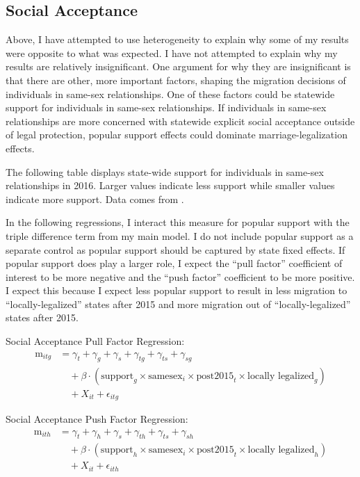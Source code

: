 \documentclass[12pt,letterpaper]{article}
\begin{document}
\clearpage
\subsection{Social Acceptance}

Above, I have attempted to use heterogeneity to explain why some of my results were opposite to what was expected. I have not attempted to explain why my results are relatively insignificant. One argument for why they are insignificant is that there are other, more important factors, shaping the migration decisions of individuals in same-sex relationships. One of these factors could be statewide support for individuals in same-sex relationships. If individuals in same-sex relationships are more concerned with statewide explicit social acceptance outside of legal protection, popular support effects could dominate marriage-legalization effects.

The following table displays state-wide support for individuals in same-sex relationships in 2016. Larger values indicate less support while smaller values indicate more support. Data comes from \citet{29}.



In the following regressions, I interact this measure for popular support with the triple difference term from my main model. I do not include popular support as a separate control as popular support should be captured by state fixed effects. If popular support does play a larger role, I expect the “pull factor” coefficient of interest to be more negative and the “push factor” coefficient to be more positive. I expect this because I expect less popular support to result in less migration to “locally-legalized” states after 2015 and more migration out of “locally-legalized” states after 2015. 

\hfill
\break
Social Acceptance Pull Factor Regression:
\begin{equation}
\begin{aligned}
\text{m}_{itg} &= \gamma_t + \gamma_g + \gamma_s + \gamma_{tg} + \gamma_{ts} + \gamma_{sg} \\
&\quad + \beta \cdot (\text{support}_g \times \text{samesex}_i \times \text{post2015}_t \times \text{locally legalized}_g) \\
&\quad + X_{it} + \epsilon_{itg}
\end{aligned}
\end{equation}

\hfill
\break
Social Acceptance Push Factor Regression:
\begin{equation}
\begin{aligned}
\text{m}_{ith} &= \gamma_t + \gamma_h + \gamma_s + \gamma_{th} + \gamma_{ts} + \gamma_{sh} \\
&\quad + \beta \cdot (\text{support}_h \times \text{samesex}_i \times \text{post2015}_t \times \text{locally legalized}_h) \\
&\quad + X_{it} + \epsilon_{ith}
\end{aligned}
\end{equation}
\end{document}
